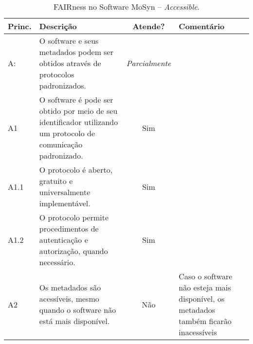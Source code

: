      
\begin{table}[tb]
    \caption{FAIRness no Software MoSyn -- \textit{Accessible}.}
    \centering
    \small
    \begin{tabular}{p{0.9cm}|p{4.9cm}|c|p{5.5cm}}
    \hline
    Princ. & Descrição & Atende? & Comentário 
    \\ \hline
     A: & O software e seus metadados podem ser obtidos através de protocolos padronizados. & \textit{Parcialmente} &\\
     A1 & O software é pode ser obtido por meio de seu identificador utilizando um protocolo de comunicação padronizado. & Sim &\\
     A1.1 & O protocolo é aberto, gratuito e universalmente implementável. & Sim &\\
     A1.2 & O protocolo permite procedimentos de autenticação e autorização, quando necessário. & Sim &\\
     A2 & Os metadados são acessíveis, mesmo quando o software não está mais disponível. & Não & Caso o software não esteja mais disponível, os metadados também ficarão inacessíveis\\
      \hline
    \end{tabular} \label{tab:fairness:garcia:a}
\end{table}


